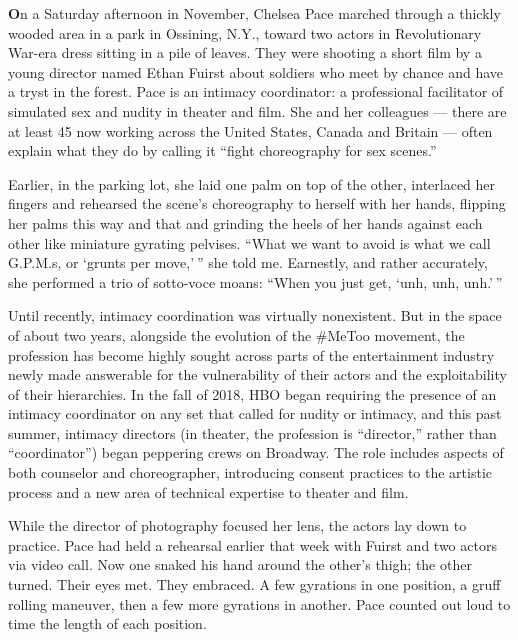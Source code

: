 \textbf{O}n a Saturday afternoon in November, Chelsea Pace marched
through a thickly wooded area in a park in Ossining, N.Y., toward two
actors in Revolutionary War-era dress sitting in a pile of leaves. They
were shooting a short film by a young director named Ethan Fuirst about
soldiers who meet by chance and have a tryst in the forest. Pace is an
intimacy coordinator: a professional facilitator of simulated sex and
nudity in theater and film. She and her colleagues --- there are at
least 45 now working across the United States, Canada and Britain ---
often explain what they do by calling it ``fight choreography for sex
scenes.''

Earlier, in the parking lot, she laid one palm on top of the other,
interlaced her fingers and rehearsed the scene's choreog­raphy to
herself with her hands, flipping her palms this way and that and
grinding the heels of her hands against each other like miniature
gyrating pelvises. ``What we want to avoid is what we call G.P.M.s, or
`grunts per move,' '' she told me. Earnestly, and rather accurately, she
performed a trio of sotto-voce moans: ``When you just get, `unh, unh,
unh.' ''

Until recently, intimacy coordination was virtually nonexistent. But in
the space of about two years, alongside the evolution of the \#MeToo
movement, the profession has become highly sought across parts of the
entertainment industry newly made answerable for the vulnerability of
their actors and the exploitability of their hierarchies. In the fall of
2018, HBO began requiring the presence of an intimacy coordinator on any
set that called for nudity or intimacy, and this past summer, intimacy
directors (in theater, the profession is ``director,'' rather than
``coordinator'') began peppering crews on Broadway. The role includes
aspects of both counselor and choreographer, introducing consent
practices to the artistic process and a new area of technical expertise
to theater and film.

While the director of photography focused her lens, the actors lay down
to practice. Pace had held a rehearsal earlier that week with Fuirst and
two actors via video call. Now one snaked his hand around the other's
thigh; the other turned. Their eyes met. They embraced. A few gyrations
in one position, a gruff rolling maneuver, then a few more gyrations in
another. Pace counted out loud to time the length of each position.

